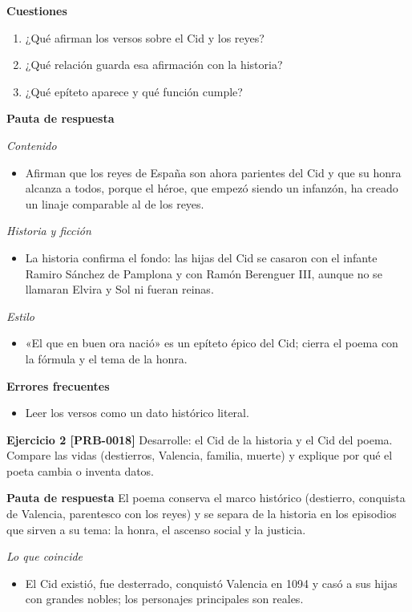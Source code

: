 \documentclass{book}
\begin{document}
\noindent\textbf{Cuestiones}
\begin{enumerate}
\item ¿Qué afirman los versos sobre el Cid y los reyes?
\item ¿Qué relación guarda esa afirmación con la historia?
\item ¿Qué epíteto aparece y qué función cumple?
\end{enumerate}

\noindent\textbf{Pauta de respuesta}

\noindent\textit{Contenido}
\begin{itemize}
\item Afirman que los reyes de España son ahora parientes del Cid y que su honra alcanza a todos, porque el héroe, que empezó siendo un infanzón, ha creado un linaje comparable al de los reyes.
\end{itemize}

\noindent\textit{Historia y ficción}
\begin{itemize}
\item La historia confirma el fondo: las hijas del Cid se casaron con el infante Ramiro Sánchez de Pamplona y con Ramón Berenguer III, aunque no se llamaran Elvira y Sol ni fueran reinas.
\end{itemize}

\noindent\textit{Estilo}
\begin{itemize}
\item «El que en buen ora nació» es un epíteto épico del Cid; cierra el poema con la fórmula y el tema de la honra.
\end{itemize}

\noindent\textbf{Errores frecuentes}
\begin{itemize}
\item Leer los versos como un dato histórico literal.
\end{itemize}

\noindent\textbf{Ejercicio 2 [PRB-0018]}
Desarrolle: el Cid de la historia y el Cid del poema. Compare las vidas (destierros, Valencia, familia, muerte) y explique por qué el poeta cambia o inventa datos.


\noindent\textbf{Pauta de respuesta}
El poema conserva el marco histórico (destierro, conquista de Valencia, parentesco con los reyes) y se separa de la historia en los episodios que sirven a su tema: la honra, el ascenso social y la justicia.


\noindent\textit{Lo que coincide}
\begin{itemize}
\item El Cid existió, fue desterrado, conquistó Valencia en 1094 y casó a sus hijas con grandes nobles; los personajes principales son reales.
\end{itemize}
\end{document}
